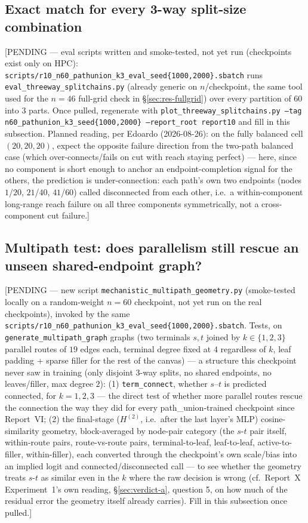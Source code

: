 \documentclass[11pt,a4paper]{article}
\begin{document}
\subsection{Exact match for every 3-way split-size combination}
\label{sec:n60-grid}

[PENDING --- eval scripts written and smoke-tested, not yet run (checkpoints exist only on
HPC): \texttt{scripts/r10\_n60\_pathunion\_k3\_eval\_seed\{1000,2000\}.sbatch} runs
\texttt{eval\_threeway\_splitchains.py} (already generic on $n$/checkpoint, the same tool used
for the $n{=}46$ full-grid check in \S\ref{sec:res-fullgrid}) over every partition of $60$ into
3 parts. Once pulled, regenerate with \texttt{plot\_threeway\_splitchains.py --tag
n60\_pathunion\_k3\_seed\{1000,2000\} --report\_root report10} and fill in this subsection.
Planned reading, per Edoardo (2026-08-26): on the fully balanced cell $(20,20,20)$, expect the
opposite failure direction from the two-path balanced case (which over-connects/fails on cut
with reach staying perfect) --- here, since no component is short enough to anchor an
endpoint-completion signal for the others, the prediction is under-connection: each path's own
two endpoints (nodes $1$/$20$, $21$/$40$, $41$/$60$) called disconnected from each other, i.e.\
a within-component long-range reach failure on all three components symmetrically, not a
cross-component cut failure.]

\subsection{Multipath test: does parallelism still rescue an unseen shared-endpoint graph?}
\label{sec:n60-multipath}

[PENDING --- new script \texttt{mechanistic\_multipath\_geometry.py} (smoke-tested locally on
a random-weight $n{=}60$ checkpoint, not yet run on the real checkpoints), invoked by the same
\texttt{scripts/r10\_n60\_pathunion\_k3\_eval\_seed\{1000,2000\}.sbatch}. Tests, on
\texttt{generate\_multipath\_graph} graphs (two terminals $s,t$ joined by $k\in\{1,2,3\}$
parallel routes of $19$ edges each, terminal degree fixed at $4$ regardless of $k$, leaf
padding + sparse filler for the rest of the canvas) --- a structure this checkpoint never saw
in training (only disjoint 3-way splits, no shared endpoints, no leaves/filler, max degree
$2$): (1) \texttt{term\_connect}, whether $s$--$t$ is predicted connected, for $k{=}1,2,3$
--- the direct test of whether more parallel routes rescue the connection the way they did for
every path\_union-trained checkpoint since Report~VI; (2) the final-stage ($H^{(2)}$,
i.e.\ after the last layer's MLP) cosine-similarity geometry, block-averaged by node-pair
category (the $s$-$t$ pair itself, within-route pairs, route-vs-route pairs, terminal-to-leaf,
leaf-to-leaf, active-to-filler, within-filler), each converted through the checkpoint's own
scale/bias into an implied logit and connected/disconnected call --- to see whether the
geometry treats $s$-$t$ as similar even in the $k$ where the raw decision is wrong (cf.\
Report~X Experiment~1's own reading, \S\ref{sec:verdict-a}, question 5, on how much of the
residual error the geometry itself already carries). Fill in this subsection once pulled.]
\end{document}
